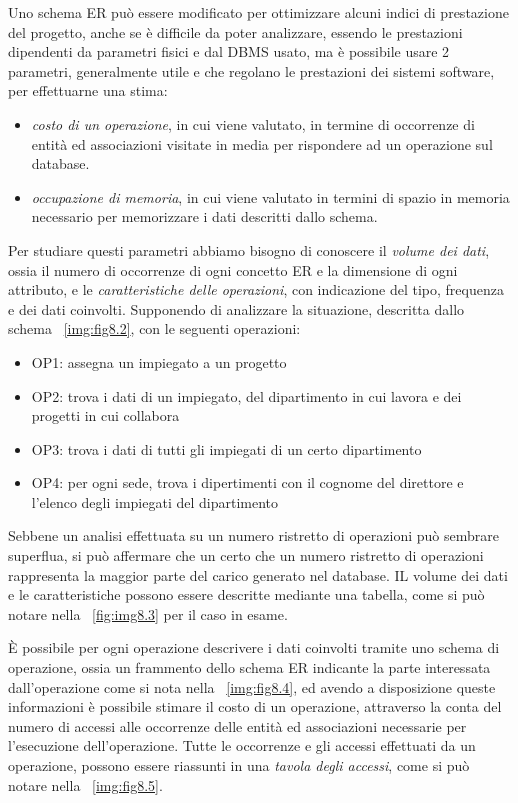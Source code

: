 Uno schema ER può essere modificato per ottimizzare alcuni indici di prestazione del progetto, anche se è difficile da poter
analizzare, essendo le prestazioni dipendenti da parametri fisici e dal DBMS usato, ma è possibile usare 2 parametri, generalmente
utile e che regolano le prestazioni dei sistemi software, per effettuarne una stima:
\begin{itemize}
        \item \emph{costo di un operazione}, in cui viene valutato, in termine di occorrenze di entità ed associazioni visitate
              in media per rispondere ad un operazione sul database.
        \item \emph{occupazione di memoria}, in cui viene valutato in termini di spazio in memoria necessario per memorizzare
              i dati descritti dallo schema.
\end{itemize}
Per studiare questi parametri abbiamo bisogno di conoscere il \emph{volume dei dati}, ossia il numero di occorrenze di ogni 
concetto ER e la dimensione di ogni attributo, e le \emph{caratteristiche delle operazioni}, con indicazione del 
tipo, frequenza e dei dati coinvolti.\newline
Supponendo di analizzare la situazione, descritta dallo schema \figurename~\ref{img:fig8.2}, con le seguenti operazioni:
\begin{itemize}
    \item OP1: assegna un impiegato a un progetto
    \item OP2: trova i dati di un impiegato, del dipartimento in cui lavora e dei progetti in cui collabora
    \item OP3: trova i dati di tutti gli impiegati di un certo dipartimento
    \item OP4: per ogni sede, trova i dipertimenti con il cognome del direttore e l'elenco degli impiegati del dipartimento
\end{itemize}
Sebbene un analisi effettuata su un numero ristretto di operazioni può sembrare superflua, si può affermare che un certo
che un numero ristretto di operazioni rappresenta la maggior parte del carico generato nel database.\newline
IL volume dei dati e le caratteristiche possono essere descritte mediante una tabella, come si può notare nella 
\figurename~\ref{fig:img8.3} per il caso in esame.

È possibile per ogni operazione descrivere i dati coinvolti tramite uno schema di operazione, ossia un frammento dello
schema ER indicante la parte interessata dall'operazione come si nota nella \figurename~\ref{img:fig8.4}, ed avendo
a disposizione queste informazioni è possibile stimare il costo di un operazione, attraverso la conta del numero di accessi
alle occorrenze delle entità ed associazioni necessarie per l'esecuzione dell'operazione.\newline
Tutte le occorrenze e gli accessi effettuati da un operazione, possono essere riassunti in una \emph{tavola degli accessi},
come si può notare nella \figurename~\ref{img:fig8.5}.

